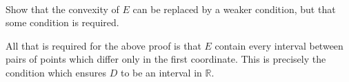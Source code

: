 \documentclass[12pt]{article}
\newenvironment{fullbox}{\begin{lrbox}{\savefullbox}\begin{minipage}{\dimexpr\textwidth-2\fboxsep\relax}}{\end{minipage}\end{lrbox}\begin{center}\framebox[\textwidth]{\usebox{\savefullbox}}\end{center}}
\newenvironment{pbox}[1][]{\begin{fullbox}\ifx#1\empty\else\paragraph{#1}\fi}{\end{fullbox}}
\theoremstyle{definition}
\newcommand{\R}{\mathbb{R}}
\begin{document}
\begin{pbox}[]
    Show that the convexity of $E$ can be replaced by a weaker condition, but that some condition is required.
\end{pbox}

All that is required for the above proof is that $E$ contain every interval between pairs of points which differ only in the first coordinate. This is precisely the condition which ensures $D$ to be an interval in $\R$.
\end{document}
